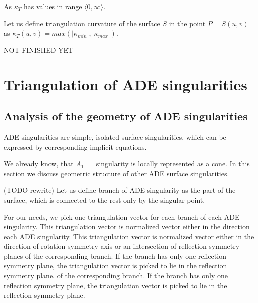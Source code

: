As $\kappa_T$ has values in range $\langle 0, \infty \rangle$.

\begin{definition}
    Let us define triangulation curvature of the surface $S$ in the point $P=S(u, v)$ as
    $\kappa_T(u, v) = max(|\kappa_{min}|, |\kappa_{max}|).$
\end{definition}

NOT FINISHED YET

\section{Triangulation of ADE singularities}
\label{sub3.2}

\subsection*{Analysis of the geometry of ADE singularities}

ADE singularities are simple, isolated surface singularities, which can be
expressed by corresponding implicit equations.

We already know, that $A_{1--}$ singularity is locally represented as a cone.
In this section we discuss geometric structure of other ADE surface singularities.

\begin{definition} (TODO rewrite)
    Let us define branch of ADE singularity as the part of the surface,
    which is connected to the rest only by the singular point.
\end{definition}

For our needs, we pick one triangulation vector for each branch of
each ADE singularity. This triangulation vector is normalized vector
either in the direction
each ADE singularity. This triangulation vector is normalized vector
either in the direction
of rotation symmetry axis or an intersection of reflection symmetry planes
of the corresponding branch. If the branch has only one reflection symmetry
plane, the triangulation vector is picked to lie in the reflection
symmetry plane.
of the corresponding branch. If the branch has only one reflection symmetry
plane, the triangulation vector is picked to lie in the reflection
symmetry plane.

